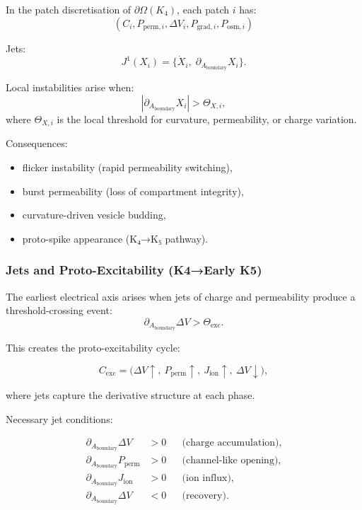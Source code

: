 In the patch discretisation of $\partial\Omega(K_4)$, each patch $i$ has:
\[
(C_i, P_{\mathrm{perm},i}, \Delta V_i, P_{\mathrm{grad},i}, P_{\mathrm{osm},i})
\]

Jets:
\[
J^1(X_i)=\bigl\{\dot{X}_i,\;\partial_{A_{\mathrm{boundary}}}X_i\bigr\}.
\]

Local instabilities arise when:
\[
|\partial_{A_{\mathrm{boundary}}}X_i| > \Theta_{X,i},
\]
where $\Theta_{X,i}$ is the local threshold for curvature, permeability,
or charge variation.

Consequences:

\begin{itemize}
    \item flicker instability (rapid permeability switching),
    \item burst permeability (loss of compartment integrity),
    \item curvature-driven vesicle budding,
    \item proto-spike appearance (K₄→K₅ pathway).
\end{itemize}


\subsubsection{Jets and Proto-Excitability (K4→Early K5)}

The earliest electrical axis arises when jets of charge and permeability
produce a threshold-crossing event:
\[
\partial_{A_{\mathrm{boundary}}}\Delta V > \Theta_{\mathrm{exc}}.
\]

This creates the proto-excitability cycle:

\[
C_{\mathrm{exc}} = 
\bigl(
\Delta V \uparrow,\ 
P_{\mathrm{perm}} \uparrow,\ 
J_{\mathrm{ion}} \uparrow,\ 
\Delta V \downarrow
\bigr),
\]

where jets capture the derivative structure at each phase.

Necessary jet conditions:

\begin{align*}
\partial_{A_{\mathrm{boundary}}}\Delta V &> 0 
&&\text{(charge accumulation)},\\
\partial_{A_{\mathrm{boundary}}}P_{\mathrm{perm}} &> 0
&&\text{(channel-like opening)},\\
\partial_{A_{\mathrm{boundary}}}J_{\mathrm{ion}} &> 0
&&\text{(ion influx)},\\
\partial_{A_{\mathrm{boundary}}}\Delta V &< 0
&&\text{(recovery)}.
\end{align*}

